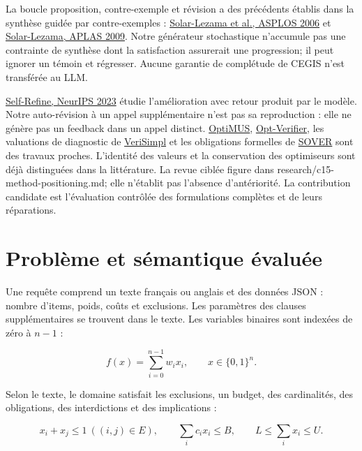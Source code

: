 \documentclass[11pt]{article}
\begin{document}
La boucle proposition, contre-exemple et révision a des précédents établis dans la synthèse guidée par contre-exemples : \href{\detokenize{https://people.csail.mit.edu/asolar/papers/Solar-LezamaTBSS06.pdf}}{Solar-Lezama et al., ASPLOS 2006} et \href{\detokenize{https://people.csail.mit.edu/asolar/papers/Solar-Lezama09.pdf}}{Solar-Lezama, APLAS 2009}. Notre générateur stochastique n'accumule pas une contrainte de synthèse dont la satisfaction assurerait une progression; il peut ignorer un témoin et régresser. Aucune garantie de complétude de CEGIS n'est transférée au LLM.

\href{\detokenize{https://proceedings.neurips.cc/paper_files/paper/2023/file/91edff07232fb1b55a505a9e9f6c0ff3-Paper-Conference.pdf}}{Self-Refine, NeurIPS 2023} étudie l'amélioration avec retour produit par le modèle. Notre auto-révision à un appel supplémentaire n'est pas sa reproduction : elle ne génère pas un feedback dans un appel distinct. \href{\detokenize{https://arxiv.org/html/2407.19633v4}}{OptiMUS}, \href{\detokenize{https://arxiv.org/html/2605.29556v1}}{Opt-Verifier}, les valuations de diagnostic de \href{\detokenize{https://arxiv.org/html/2607.20474v2}}{VeriSimpl} et les obligations formelles de \href{\detokenize{https://arxiv.org/html/2609.00728v1}}{SOVER} sont des travaux proches. L'identité des valeurs et la conservation des optimiseurs sont déjà distinguées dans la littérature. La revue ciblée figure dans research/c15-method-positioning.md; elle n'établit pas l'absence d'antériorité. La contribution candidate est l'évaluation contrôlée des formulations complètes et de leurs réparations.

\section{Problème et sémantique évaluée}

Une requête comprend un texte français ou anglais et des données JSON : nombre d'items, poids, coûts et exclusions. Les paramètres des clauses supplémentaires se trouvent dans le texte. Les variables binaires sont indexées de zéro à $n-1$ :

\[f(x)=\sum_{i=0}^{n-1}w_i x_i,\qquad x\in\{0,1\}^n.\]

Selon le texte, le domaine satisfait les exclusions, un budget, des cardinalités, des obligations, des interdictions et des implications :

\[x_i+x_j\leq1\ ((i,j)\in E),\qquad \sum_i c_i x_i\leq B,\qquad L\leq\sum_i x_i\leq U.\]
\end{document}
